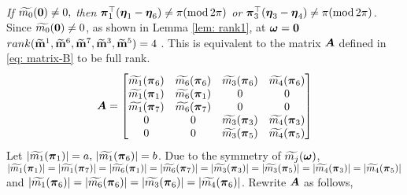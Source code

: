 \\[.2em]
{\it If $\widetilde{m_0}(\boldsymbol{0})\neq 0,$ then $\boldsymbol{\pi}_1^\top(\boldsymbol{\eta}_1-\boldsymbol{\eta}_6)\neq \pi(\text{mod}\,2\pi)$ or $\boldsymbol{\pi}_3^\top(\boldsymbol{\eta}_3-\boldsymbol{\eta}_4)\neq \pi(\text{mod}\,2\pi)$. }\\[1em]
 Since $\widetilde{m_0}(\boldsymbol{0})\neq 0$, as shown in Lemma \ref{lem: rank1}, at $\boldsymbol{\omega} = \boldsymbol{0}$ $rank(\widetilde{\mathbf{m}}^{1},\widetilde{\mathbf{m}}^{6},\widetilde{\mathbf{m}}^{7},\widetilde{\mathbf{m}}^{3},\widetilde{\mathbf{m}}^{5})= 4$ . This is equivalent to the matrix $\boldsymbol{A}$ defined in \eqref{eq: matrix-B} to be full rank.
\begin{align}\label{eq: matrix-B}
\boldsymbol{A} = 
\begin{bmatrix}
& & & \\[-1em]
\widetilde{m_1}(\boldsymbol{\pi}_6) & \widetilde{m_6}(\boldsymbol{\pi}_6) & \widetilde{m_3}(\boldsymbol{\pi}_6) & \widetilde{m_4}(\boldsymbol{\pi}_6) \\
\widetilde{m_1}(\boldsymbol{\pi}_1) & \widetilde{m_6}(\boldsymbol{\pi}_1) & 0 & 0\\
\widetilde{m_1}(\boldsymbol{\pi}_7) & \widetilde{m_6}(\boldsymbol{\pi}_7) & 0 & 0\\
0 & 0 & \widetilde{m_3}(\boldsymbol{\pi}_3) & \widetilde{m_4}(\boldsymbol{\pi}_3)\\
0 & 0 & \widetilde{m_3}(\boldsymbol{\pi}_5) & \widetilde{m_4}(\boldsymbol{\pi}_5)\\
\end{bmatrix}
\end{align}
Let $|\widetilde{m_1}(\boldsymbol{\pi}_1)| = a, \, |\widetilde{m_1}(\boldsymbol{\pi}_6)|=b$. Due to the symmetry of $\widetilde{m_{j}}(\boldsymbol{\omega})$,
$|\widetilde{m_1}(\boldsymbol{\pi}_1)| = |\widetilde{m_1}(\boldsymbol{\pi}_7)| = |\widetilde{m_6}(\boldsymbol{\pi}_1)| = |\widetilde{m_6}(\boldsymbol{\pi}_7)| = |\widetilde{m_3}(\boldsymbol{\pi}_3)| = |\widetilde{m_3}(\boldsymbol{\pi}_5)| = |\widetilde{m_4}(\boldsymbol{\pi}_3)| = |\widetilde{m_4}(\boldsymbol{\pi}_5)|$ and $|\widetilde{m_1}(\boldsymbol{\pi}_6)|=| \widetilde{m_6}(\boldsymbol{\pi}_6)|= | \widetilde{m_3}(\boldsymbol{\pi}_6)|=| \widetilde{m_4}(\boldsymbol{\pi}_6)|$. Rewrite $\boldsymbol{A}$ as follows,
